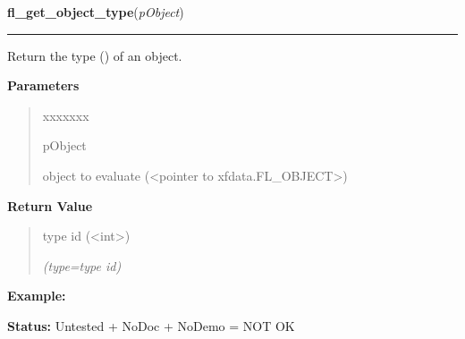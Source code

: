 \hspace{.8\funcindent}\begin{boxedminipage}{\funcwidth}

    \raggedright \textbf{fl\_get\_object\_type}(\textit{pObject})

    \vspace{-1.5ex}

    \rule{\textwidth}{0.5\fboxrule}
\setlength{\parskip}{2ex}
    Return the type () of an object.

\setlength{\parskip}{1ex}
      \textbf{Parameters}
      \vspace{-1ex}

      \begin{quote}
        \begin{Ventry}{xxxxxxx}

          \item[pObject]

          object to evaluate ({\textless}pointer to 
          xfdata.FL\_OBJECT{\textgreater})

        \end{Ventry}

      \end{quote}

      \textbf{Return Value}
    \vspace{-1ex}

      \begin{quote}
      type id ({\textless}int{\textgreater})

      {\it (type=type id)}

      \end{quote}

\textbf{Example:} 

\textbf{Status:} Untested + NoDoc + NoDemo = NOT OK



    \end{boxedminipage}

    \label{xformslib:library:fl_set_object_boxtype}

    \vspace{0.5ex}


